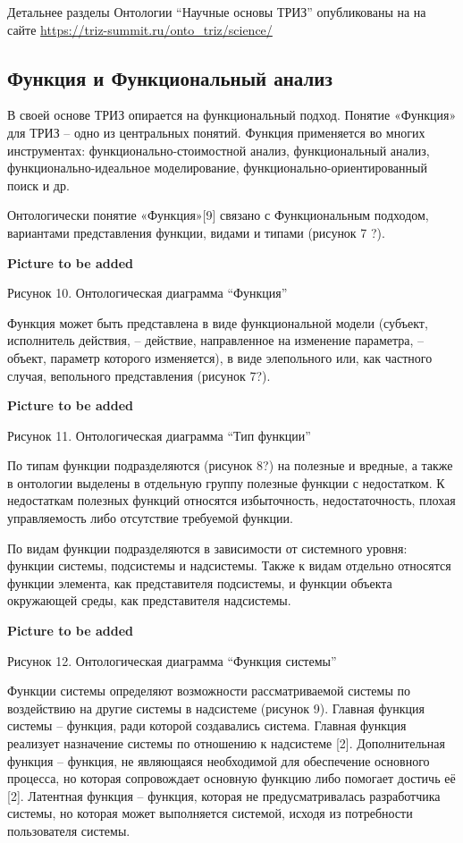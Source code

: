 \documentclass[11pt,a4paper]{article}
\newcommand{\addpicture}{\textbf{Picture to be added}\par}
\begin{document}
Детальнее разделы Онтологии “Научные основы ТРИЗ” опубликованы на на сайте
\url{https://triz-summit.ru/onto_triz/science/}

\subsection{Функция и Функциональный анализ}

В своей основе ТРИЗ опирается на функциональный подход. Понятие «Функция» для
ТРИЗ – одно из центральных понятий. Функция применяется во многих
инструментах: функционально-стоимостной анализ, функциональный анализ,
функционально-идеальное моделирование, функционально-ориентированный поиск и
др.

Онтологически понятие «Функция»[9] связано с Функциональным подходом,
вариантами представления функции, видами и типами (рисунок 7 ?).
\begin{center}
  \addpicture
  Рисунок 10. Онтологическая диаграмма “Функция”
\end{center}
Функция может быть представлена в виде функциональной модели (субъект,
исполнитель действия, -- действие, направленное на изменение параметра, --
объект, параметр которого изменяется), в виде элепольного или, как частного
случая, вепольного представления (рисунок 7?).
\begin{center}
  \addpicture
  Рисунок 11. Онтологическая диаграмма “Тип функции”
\end{center}
По типам функции подразделяются (рисунок 8?) на полезные и вредные, а также в
онтологии выделены в отдельную группу полезные функции с недостатком. К
недостаткам полезных функций относятся избыточность, недостаточность, плохая
управляемость либо отсутствие требуемой функции.

По видам функции подразделяются в зависимости от системного уровня: функции
системы, подсистемы и надсистемы. Также к видам отдельно относятся функции
элемента, как представителя подсистемы, и функции объекта окружающей среды,
как представителя надсистемы.

\begin{center}
  \addpicture
  Рисунок 12. Онтологическая диаграмма “Функция системы”
\end{center}
Функции системы определяют возможности рассматриваемой системы по воздействию
на другие системы в надсистеме (рисунок 9). Главная функция системы – функция,
ради которой создавались система. Главная функция реализует назначение системы
по отношению к надсистеме [2]. Дополнительная функция – функция, не являющаяся
необходимой для обеспечение основного процесса, но которая сопровождает
основную функцию либо помогает достичь её [2]. Латентная функция – функция,
которая не предусматривалась разработчика системы, но которая может
выполняется системой, исходя из потребности пользователя системы.
\end{document}
